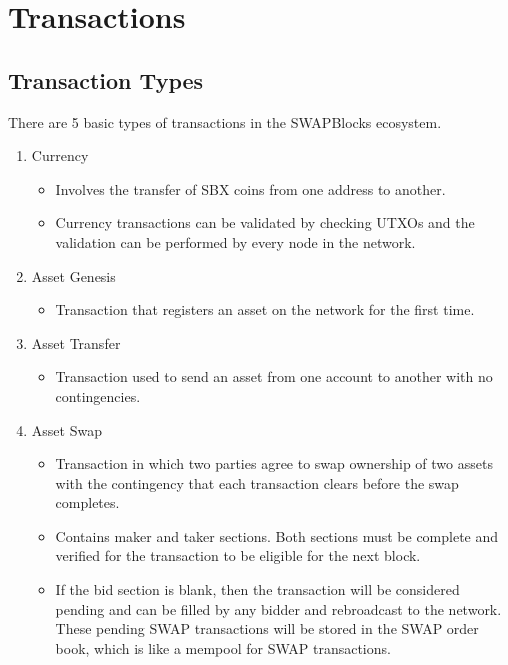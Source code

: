 \documentclass[12pt]{article}
\begin{document}


\section{Transactions}

\subsection{Transaction Types}
There are 5 basic types of transactions in the SWAPBlocks ecosystem.

\begin{enumerate}
	\item Currency
		\begin{itemize}
			\item{Involves the transfer of SBX coins from one address to another.}
			\item{Currency transactions can be validated by checking UTXOs and the
				validation can be performed by every node in the network.}
		\end{itemize}
	\item Asset Genesis
		\begin{itemize}
			\item{Transaction that registers an asset on the network for the first time.}
		\end{itemize}
	\item Asset Transfer
		\begin{itemize}
			\item{Transaction used to send an asset from one account to another
				with no contingencies.}
		\end{itemize}
	\item Asset Swap
		\begin{itemize}
			\item{Transaction in which two parties agree to swap 
				ownership of two assets with the contingency that 
				each transaction clears before the swap completes.}
			\item{Contains maker and taker sections. Both sections must
				be complete and verified for the transaction to be eligible for
				the next block.}
			\item{If the bid section is blank, then the transaction will be considered pending and can
				be filled by any bidder and rebroadcast to the network. These pending SWAP transactions
				will be stored in the SWAP order book, which is like a mempool for SWAP transactions.} 
		\end{itemize}

\end{enumerate}
\end{document}

